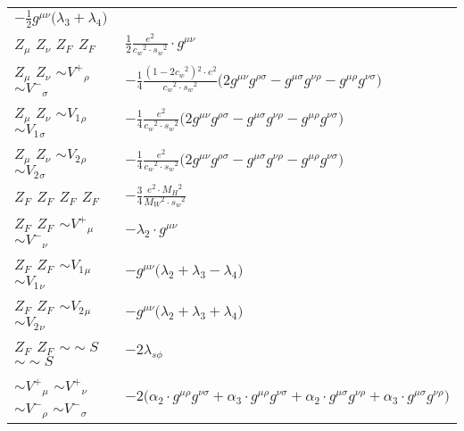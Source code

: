 \begin{center}
\begin{tabular}{|l|l|}
	$-\frac{1}{2}g^{\mu \nu} \big( \lambda_3+ \lambda_4\big)$\\[2mm]
${Z}_{\mu }$ \phantom{-} ${Z}_{\nu }$ \phantom{-} $Z_F{}_{}$ \phantom{-} $Z_F{}_{}$ \phantom{-}  &
	$\frac{1}{2}\frac{ e{}^2 }{ c_w{}^2  \cdot s_w{}^2 }\cdot g^{\mu \nu} $\\[2mm]
${Z}_{\mu }$ \phantom{-} ${Z}_{\nu }$ \phantom{-} $\sim V^+{}_{\rho }$ \phantom{-} $\sim V^-{}_{\sigma }$ \phantom{-}  &
	$-\frac{1}{4}\frac{ (1-2 c_w {}^2){}^2  \cdot e{}^2 }{ c_w{}^2  \cdot s_w{}^2 }\big(2g^{\mu \nu} g^{\rho \sigma} -g^{\mu \sigma} g^{\nu \rho} -g^{\mu \rho} g^{\nu \sigma} \big)$\\[2mm]
${Z}_{\mu }$ \phantom{-} ${Z}_{\nu }$ \phantom{-} $\sim V_1{}_{\rho }$ \phantom{-} $\sim V_1{}_{\sigma }$ \phantom{-}  &
	$-\frac{1}{4}\frac{ e{}^2 }{ c_w{}^2  \cdot s_w{}^2 }\big(2g^{\mu \nu} g^{\rho \sigma} -g^{\mu \sigma} g^{\nu \rho} -g^{\mu \rho} g^{\nu \sigma} \big)$\\[2mm]
${Z}_{\mu }$ \phantom{-} ${Z}_{\nu }$ \phantom{-} $\sim V_2{}_{\rho }$ \phantom{-} $\sim V_2{}_{\sigma }$ \phantom{-}  &
	$-\frac{1}{4}\frac{ e{}^2 }{ c_w{}^2  \cdot s_w{}^2 }\big(2g^{\mu \nu} g^{\rho \sigma} -g^{\mu \sigma} g^{\nu \rho} -g^{\mu \rho} g^{\nu \sigma} \big)$\\[2mm]
$Z_F{}_{}$ \phantom{-} $Z_F{}_{}$ \phantom{-} $Z_F{}_{}$ \phantom{-} $Z_F{}_{}$ \phantom{-}  &
	$-\frac{3}{4}\frac{ e{}^2  \cdot M_H{}^2 }{ M_W{}^2  \cdot s_w{}^2 }$\\[2mm]
$Z_F{}_{}$ \phantom{-} $Z_F{}_{}$ \phantom{-} $\sim V^+{}_{\mu }$ \phantom{-} $\sim V^-{}_{\nu }$ \phantom{-}  &
	$- \lambda_2\cdot g^{\mu \nu} $\\[2mm]
$Z_F{}_{}$ \phantom{-} $Z_F{}_{}$ \phantom{-} $\sim V_1{}_{\mu }$ \phantom{-} $\sim V_1{}_{\nu }$ \phantom{-}  &
	$-g^{\mu \nu} \big( \lambda_2+ \lambda_3- \lambda_4\big)$\\[2mm]
$Z_F{}_{}$ \phantom{-} $Z_F{}_{}$ \phantom{-} $\sim V_2{}_{\mu }$ \phantom{-} $\sim V_2{}_{\nu }$ \phantom{-}  &
	$-g^{\mu \nu} \big( \lambda_2+ \lambda_3+ \lambda_4\big)$\\[2mm]
$Z_F{}_{}$ \phantom{-} $Z_F{}_{}$ \phantom{-} $\sim\sim S{}_{}$ \phantom{-} $\sim\sim S{}_{}$ \phantom{-}  &
	$-2 \lambda_{s\phi}$\\[2mm]
$\sim V^+{}_{\mu }$ \phantom{-} $\sim V^+{}_{\nu }$ \phantom{-} $\sim V^-{}_{\rho }$ \phantom{-} $\sim V^-{}_{\sigma }$ \phantom{-}  &
	$-2\big( \alpha_2\cdot g^{\mu \rho} g^{\nu \sigma} + \alpha_3\cdot g^{\mu \rho} g^{\nu \sigma} + \alpha_2\cdot g^{\mu \sigma} g^{\nu \rho} + \alpha_3\cdot g^{\mu \sigma} g^{\nu \rho} \big)$\\[2mm]

\end{tabular}
\end{center}

